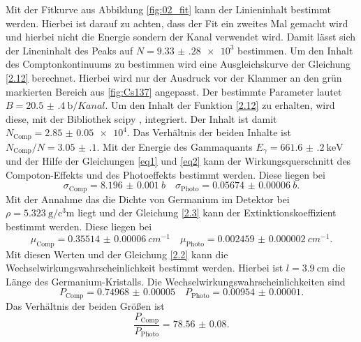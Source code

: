 Mit der Fitkurve aus Abbildung \ref{fig:02_fit} kann der Linieninhalt bestimmt werden. Hierbei ist darauf zu achten, dass der Fit ein zweites Mal gemacht wird 
und hierbei nicht die Energie sondern der Kanal verwendet wird. Damit lässt sich der Lineninhalt des Peaks auf $N=\num{9.33(28)e3}$ bestimmen.
Um den Inhalt des Comptonkontinuums zu bestimmen wird eine Ausgleichskurve der Gleichung \ref{2.12} berechnet.
Hierbei wird nur der Ausdruck vor der Klammer an den grün markierten Bereich aus \ref{fig:Cs137} angepasst.
Der bestimmte Parameter lautet $B=\SI{20.5(4)}{\barn\per Kanal}$. Um den Inhalt der Funktion \ref{2.12} zu erhalten,
wird diese,  mit der Bibliothek scipy \cite{scipy}, integriert. Der Inhalt ist damit $N_{\text{Comp}} = \num{2.85(5)e4}$.
Das Verhältnis der beiden Inhalte ist $N_{\text{Comp}}/N=\num{3.05(10)}$.
Mit der Energie des Gammaquants $E_{\gamma}=\SI{661.6(2)}{\kilo\eV}$ und der Hilfe der Gleichungen \eqref{eq1} und 
\eqref{eq2} kann der Wirkungsquerschnitt des Compoton-Effekts und des Photoeffekts bestimmt werden.
Diese liegen bei 
\begin{equation*}
  \sigma_{\text{Comp}}=\SI{8.196(1)}{b} \quad \sigma_{\text{Photo}}=\SI{0.05674(6)}{b}.
\end{equation*} 
Mit der Annahme das die Dichte von Germanium im Detektor bei $\rho = \SI{5.323}{\gram\per\cubic\centi\meter}$ \cite{Germanium_rho} liegt und der
Gleichung \eqref{2.3} kann der Extinktionskoeffizient bestimmt werden.
Diese liegen bei 
\begin{equation*}
  \mu_{\text{Comp}} = \SI{0.35514(6)}{cm^{-1}} \quad \mu_{\text{Photo}} = \SI{0.002459(2)}{cm^{-1}}.
\end{equation*}
Mit diesen Werten und der Gleichung \eqref{2.2} kann die Wechselwirkungswahrscheinlichkeit bestimmt werden.
Hierbei ist $l=\SI{3.9}{\centi\meter}$ die Länge des Germanium-Kristalls.
Die Wechselwirkungswahrscheinlichkeiten sind 
\begin{equation*}
  P_{\text{Comp}} = \num{0.74968(5)}\quad P_{\text{Photo}} = \num{0.00954(1)}.
\end{equation*}
Das Verhältnis der beiden Größen ist
\begin{equation*}
  \frac{P_{\text{Comp}} }{P_{\text{Photo}}} = \num{78.56(8)}.
\end{equation*}

